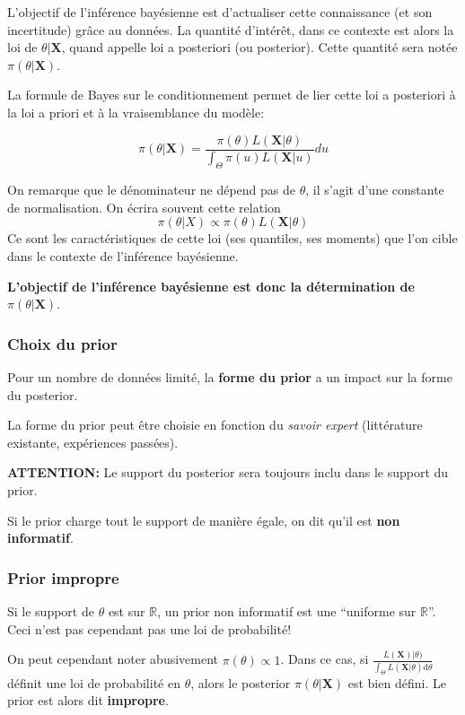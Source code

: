 \documentclass[]{article}
\begin{document}
L'objectif de l'inférence bayésienne est d'actualiser cette connaissance
(et son incertitude) grâce au données. La quantité d'intérêt, dans ce
contexte est alors la loi de \(\theta\vert \mathbf{X}\), quand appelle
loi a posteriori (ou posterior). Cette quantité sera notée
\(\pi(\theta \vert \mathbf{X})\).

La formule de Bayes sur le conditionnement permet de lier cette loi a
posteriori à la loi a priori et à la vraisemblance du modèle:

\[\pi(\theta\vert \mathbf{X}) = \frac{\pi(\theta)L(\mathbf{X}\vert \theta)}{\int_\Theta \pi(u)L(\mathbf{X}\vert u)} d u\]

On remarque que le dénominateur ne dépend pas de \(\theta\), il s'agit
d'une constante de normalisation. On écrira souvent cette relation
\[\pi(\theta \vert X) \propto \pi(\theta)L(\mathbf{X}\vert \theta)\] Ce
sont les caractéristiques de cette loi (ses quantiles, ses moments) que
l'on cible dans le contexte de l'inférence bayésienne.

\textbf{L'objectif de l'inférence bayésienne est donc la détermination
de \(\pi(\theta\vert \mathbf{X})\)}.

\hypertarget{choix-du-prior}{%
\subsubsection{Choix du prior}\label{choix-du-prior}}

Pour un nombre de données limité, la \textbf{forme du prior} a un impact
sur la forme du posterior.

La forme du prior peut être choisie en fonction du \emph{savoir expert}
(littérature existante, expériences passées).

\textbf{ATTENTION:} Le support du posterior sera toujours inclu dans le
support du prior.

Si le prior charge tout le support de manière égale, on dit qu'il est
\textbf{non informatif}.

\hypertarget{prior-impropre}{%
\subsubsection{Prior impropre}\label{prior-impropre}}

Si le support de \(\theta\) est sur \(\mathbb{R}\), un prior non
informatif est une ``uniforme sur \(\mathbb{R}\)''. Ceci n'est pas
cependant pas une loi de probabilité!

On peut cependant noter abusivement \(\pi(\theta) \propto 1\). Dans ce
cas, si
\(\frac{L(\mathbf{X}) \vert \theta)}{\int_\Theta L\left(\mathbf{X} \vert \theta\right)\text{d} \theta}\)
définit une loi de probabilité en \(\theta\), alors le posterior
\(\pi(\theta\vert \mathbf{X})\) est bien défini. Le prior est alors dit
\textbf{impropre}.
\end{document}
